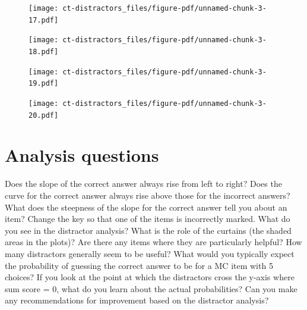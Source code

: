 \documentclass[
  letterpaper,
  DIV=11,
  numbers=noendperiod]{scrreprt}
\begin{document}
\begin{figure}[H]

{\centering \texttt{[image: ct-distractors\_files/figure-pdf/unnamed-chunk-3-17.pdf]}

}

\end{figure}

\begin{figure}[H]

{\centering \texttt{[image: ct-distractors\_files/figure-pdf/unnamed-chunk-3-18.pdf]}

}

\end{figure}

\begin{figure}[H]

{\centering \texttt{[image: ct-distractors\_files/figure-pdf/unnamed-chunk-3-19.pdf]}

}

\end{figure}

\begin{figure}[H]

{\centering \texttt{[image: ct-distractors\_files/figure-pdf/unnamed-chunk-3-20.pdf]}

}

\end{figure}

\hypertarget{analysis-questions}{%
\section{Analysis questions}\label{analysis-questions}}

Does the slope of the correct answer always rise from left to right?
Does the curve for the correct answer always rise above those for the
incorrect answers? What does the steepness of the slope for the correct
answer tell you about an item? Change the key so that one of the items
is incorrectly marked. What do you see in the distractor analysis? What
is the role of the curtains (the shaded areas in the plots)? Are there
any items where they are particularly helpful? How many distractors
generally seem to be useful? What would you typically expect the
probability of guessing the correct answer to be for a MC item with 5
choices? If you look at the point at which the distractors cross the
y-axis where sum score = 0, what do you learn about the actual
probabilities? Can you make any recommendations for improvement based on
the distractor analysis?
\end{document}
